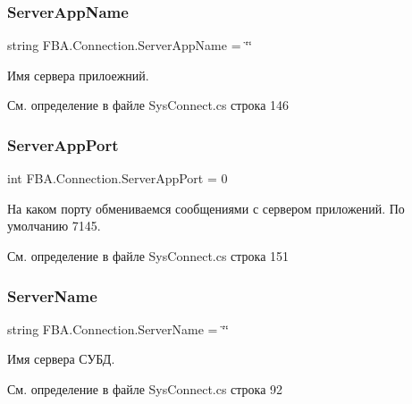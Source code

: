 \subsubsection{\texorpdfstring{Server\+App\+Name}{ServerAppName}}
{\footnotesize\ttfamily string F\+B\+A.\+Connection.\+Server\+App\+Name = \char`\"{}\char`\"{}}



Имя сервера прилоежний. 



См. определение в файле Sys\+Connect.\+cs строка 146

\mbox{\label{class_f_b_a_1_1_connection_a556479c8ba68bce8cee63c53e8583c14}} 
\subsubsection{\texorpdfstring{Server\+App\+Port}{ServerAppPort}}
{\footnotesize\ttfamily int F\+B\+A.\+Connection.\+Server\+App\+Port = 0}



На каком порту обмениваемся сообщениями с сервером приложений. По умолчанию 7145. 



См. определение в файле Sys\+Connect.\+cs строка 151

\mbox{\label{class_f_b_a_1_1_connection_a6a04e4e09b3be5fc37491234ccf46a61}} 
\subsubsection{\texorpdfstring{Server\+Name}{ServerName}}
{\footnotesize\ttfamily string F\+B\+A.\+Connection.\+Server\+Name = \char`\"{}\char`\"{}}



Имя сервера СУБД. 



См. определение в файле Sys\+Connect.\+cs строка 92

\mbox{\label{class_f_b_a_1_1_connection_ad5c6e7969020c242db56e1910c6e353f}} 
